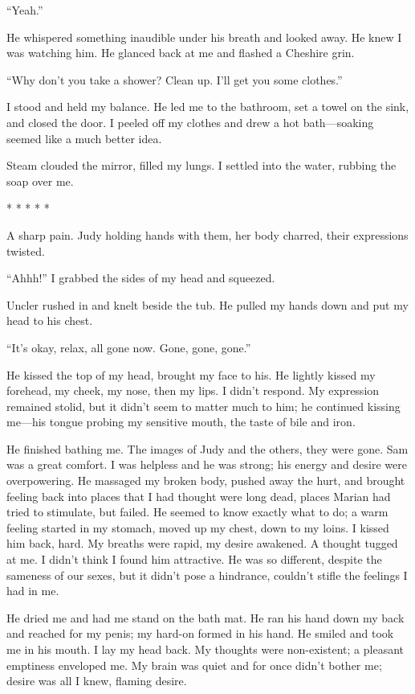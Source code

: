 \documentclass[
]{article}
\begin{document}
``Yeah.''

He whispered something inaudible under his breath and looked away. He
knew I was watching him. He glanced back at me and flashed a Cheshire
grin.

``Why don't you take a shower? Clean up. I'll get you some clothes.''

I stood and held my balance. He led me to the bathroom, set a towel on
the sink, and closed the door. I peeled off my clothes and drew a hot
bath---soaking seemed like a much better idea.

Steam clouded the mirror, filled my lungs. I settled into the water,
rubbing the soap over me.

* * * * *

A sharp pain. Judy holding hands with them, her body charred, their
expressions twisted.

``Ahhh!'' I grabbed the sides of my head and squeezed.

Uncler rushed in and knelt beside the tub. He pulled my hands down and
put my head to his chest.

``It's okay, relax, all gone now. Gone, gone, gone.''

He kissed the top of my head, brought my face to his. He lightly kissed
my forehead, my cheek, my nose, then my lips. I didn't respond. My
expression remained stolid, but it didn't seem to matter much to him; he
continued kissing me---his tongue probing my sensitive mouth, the taste
of bile and iron.

He finished bathing me. The images of Judy and the others, they were
gone. Sam was a great comfort. I was helpless and he was strong; his
energy and desire were overpowering. He massaged my broken body, pushed
away the hurt, and brought feeling back into places that I had thought
were long dead, places Marian had tried to stimulate, but failed. He
seemed to know exactly what to do; a warm feeling started in my stomach,
moved up my chest, down to my loins. I kissed him back, hard. My breaths
were rapid, my desire awakened. A thought tugged at me. I didn't think I
found him attractive. He was so different, despite the sameness of our
sexes, but it didn't pose a hindrance, couldn't stifle the feelings I
had in me.

He dried me and had me stand on the bath mat. He ran his hand down my
back and reached for my penis; my hard-on formed in his hand. He smiled
and took me in his mouth. I lay my head back. My thoughts were
non-existent; a pleasant emptiness enveloped me. My brain was quiet and
for once didn't bother me; desire was all I knew, flaming desire.
\end{document}
